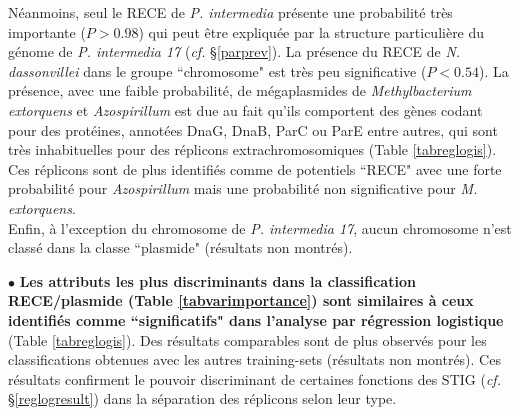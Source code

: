 Néanmoins, seul le RECE de \textit{P. intermedia} présente une probabilité très importante ($P>0.98$) qui peut être expliquée par la structure particulière du génome de \textit{P. intermedia 17} (\textit{cf.} \S \ref{parprev}). La présence du RECE de \textit{N. dassonvillei} dans le groupe ``chromosome" est très peu significative ($P<0.54$). La présence, avec une faible probabilité, de mégaplasmides de \textit{Methylbacterium extorquens} et \textit{Azospirillum} est due au fait qu'ils comportent des gènes codant pour des protéines, annotées DnaG, DnaB, ParC ou ParE entre autres, qui sont très inhabituelles pour des réplicons extrachromosomiques (Table \ref{tabreglogis}). Ces réplicons sont de plus identifiés comme de potentiels ``RECE" avec une forte probabilité pour \textit{Azospirillum} mais une probabilité non significative pour \textit{M. extorquens}.\\
Enfin, à l'exception du chromosome de \textit{P. intermedia 17}, aucun chromosome n'est classé dans la classe ``plasmide" (résultats non montrés). 
	  
 $\bullet$ \textbf{Les attributs les plus discriminants dans la classification RECE/plasmide (Table \ref{tabvarimportance}) sont similaires à ceux identifiés comme ``significatifs" dans l'analyse par régression logistique} (Table \ref{tabreglogis}). Des résultats comparables sont de plus observés pour les classifications obtenues avec les autres training-sets (résultats non montrés). Ces résultats confirment le pouvoir discriminant de certaines fonctions des STIG (\textit{cf.} \S \ref{reglogresult}) dans la séparation des réplicons selon leur type.\\
 
